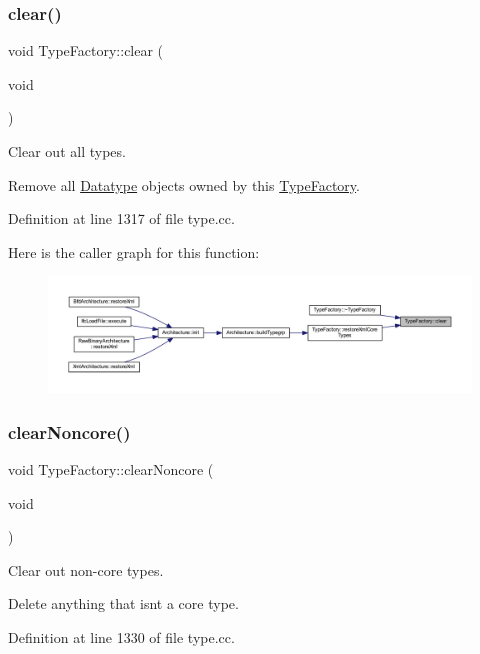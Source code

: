 \subsubsection{\texorpdfstring{clear()}{clear()}}
{\footnotesize\ttfamily void Type\+Factory\+::clear (\begin{DoxyParamCaption}\item[{void}]{ }\end{DoxyParamCaption})}



Clear out all types. 

Remove all \mbox{\hyperlink{class_datatype}{Datatype}} objects owned by this \mbox{\hyperlink{class_type_factory}{Type\+Factory}}. 

Definition at line 1317 of file type.\+cc.

Here is the caller graph for this function\+:
\nopagebreak
\begin{figure}[H]
\begin{center}
\leavevmode
\includegraphics[width=350pt]{class_type_factory_a8497930bbd88dd89d91536de06a79f3f_icgraph}
\end{center}
\end{figure}
\mbox{\label{class_type_factory_afa4b55a83c2f6dbb6f4f13b5ca930ae4}} 
\subsubsection{\texorpdfstring{clearNoncore()}{clearNoncore()}}
{\footnotesize\ttfamily void Type\+Factory\+::clear\+Noncore (\begin{DoxyParamCaption}\item[{void}]{ }\end{DoxyParamCaption})}



Clear out non-\/core types. 

Delete anything that isn\textquotesingle{}t a core type. 

Definition at line 1330 of file type.\+cc.

